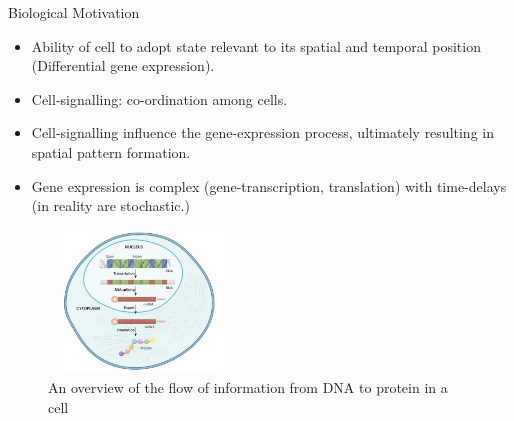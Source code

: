 \documentclass{beamer}
\begin{document}
\begin{frame}{Biological Motivation \cite{gaffmonk,william}}
\begin{itemize}
    \item Ability of cell to adopt state relevant to its spatial and temporal position (Differential gene expression).
    \item Cell-signalling: co-ordination among cells.
    \item Cell-signalling influence the gene-expression process, ultimately resulting in spatial pattern formation.
    \item Gene expression is complex (gene-transcription, translation) with time-delays (in reality are stochastic.)
\end{itemize}

\begin{figure}[H]
        \centering
        \hspace*{6cm}\includegraphics[width=5cm,height=3.8cm]{geneexp.png}
        \caption{An overview of the flow of information from DNA to protein in a cell \cite{nature}}
    \end{figure}
\end{frame}
\end{document}
